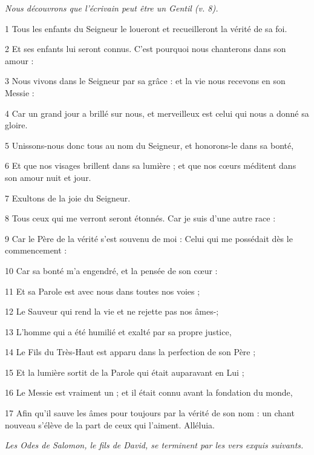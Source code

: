 
\par \textit{Nous découvrons que l'écrivain peut être un Gentil (v. 8).}

\par 1 Tous les enfants du Seigneur le loueront et recueilleront la vérité de sa foi.
\par 2 Et ses enfants lui seront connus. C'est pourquoi nous chanterons dans son amour :
\par 3 Nous vivons dans le Seigneur par sa grâce : et la vie nous recevons en son Messie :
\par 4 Car un grand jour a brillé sur nous, et merveilleux est celui qui nous a donné sa gloire.
\par 5 Unissons-nous donc tous au nom du Seigneur, et honorons-le dans sa bonté,
\par 6 Et que nos visages brillent dans sa lumière ; et que nos cœurs méditent dans son amour nuit et jour.
\par 7 Exultons de la joie du Seigneur.
\par 8 Tous ceux qui me verront seront étonnés. Car je suis d'une autre race :
\par 9 Car le Père de la vérité s'est souvenu de moi : Celui qui me possédait dès le commencement :
\par 10 Car sa bonté m'a engendré, et la pensée de son cœur :
\par 11 Et sa Parole est avec nous dans toutes nos voies ;
\par 12 Le Sauveur qui rend la vie et ne rejette pas nos âmes-;
\par 13 L'homme qui a été humilié et exalté par sa propre justice,
\par 14 Le Fils du Très-Haut est apparu dans la perfection de son Père ;
\par 15 Et la lumière sortit de la Parole qui était auparavant en Lui ;
\par 16 Le Messie est vraiment un ; et il était connu avant la fondation du monde,
\par 17 Afin qu'il sauve les âmes pour toujours par la vérité de son nom : un chant nouveau s'élève de la part de ceux qui l'aiment. Alléluia.


\par \textit{Les Odes de Salomon, le fils de David, se terminent par les vers exquis suivants.}

